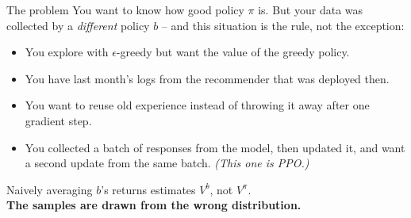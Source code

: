 \documentclass[aspectratio=169]{beamer}
\begin{document}
\begin{frame}{The problem}
  \small
  You want to know how good policy $\pi$ is. But your data was collected by a \emph{different}
  policy $b$ -- and this situation is the rule, not the exception:

  \vskip 6pt
  \begin{itemize}\itemsep3pt
    \item You explore with $\epsilon$-greedy but want the value of the greedy policy.
    \item You have last month's logs from the recommender that was deployed then.
    \item You want to reuse old experience instead of throwing it away after one gradient step.
    \item You collected a batch of responses from the model, then updated it, and want a second
          update from the same batch. \emph{(This one is PPO.)}
  \end{itemize}

  \vskip 8pt
  \begin{center}
  \begin{tcolorbox}[colback=lightbg, colframe=popblue, boxrule=0.7pt, arc=2pt, width=0.8\textwidth]
    \begin{center}
      \small
      Naively averaging $b$'s returns estimates $V^b$, not $V^\pi$.\\
      \textbf{The samples are drawn from the wrong distribution.}
    \end{center}
  \end{tcolorbox}
  \end{center}
\end{frame}
\end{document}
